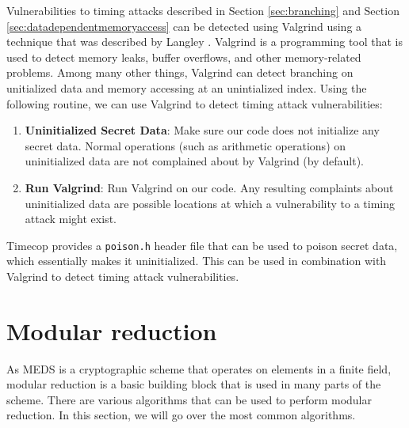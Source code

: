 \documentclass[11pt,a4paper]{report}
\theoremstyle{definition}
\begin{document}
Vulnerabilities to timing attacks described in Section \ref{sec:branching} and Section \ref{sec:datadependentmemoryaccess} can be detected using Valgrind \cite{nethercote2007valgrind} using a technique that was described by Langley \cite{langley2010checking,langley2010ctgrind}. Valgrind is a programming tool that is used to detect memory leaks, buffer overflows, and other memory-related problems. Among many other things, Valgrind can detect branching on unitialized data and memory accessing at an unintialized index. Using the following routine, we can use Valgrind to detect timing attack vulnerabilities:
\begin{enumerate}
  \item \textbf{Uninitialized Secret Data}: Make sure our code does not initialize any secret data. Normal operations (such as arithmetic operations) on uninitialized data are not complained about by Valgrind (by default).
  \item \textbf{Run Valgrind}: Run Valgrind on our code. Any resulting complaints about uninitialized data are possible locations at which a vulnerability to a timing attack might exist.
\end{enumerate}

Timecop \cite{timecop} provides a \texttt{poison.h} header file that can be used to poison secret data, which essentially makes it uninitialized. This can be used in combination with Valgrind to detect timing attack vulnerabilities.

\section{Modular reduction}
\label{sec:preliminariesmodularreduction}
As MEDS is a cryptographic scheme that operates on elements in a finite field, modular reduction is a basic building block that is used in many parts of the scheme. There are various algorithms that can be used to perform modular reduction. In this section, we will go over the most common algorithms.
\end{document}
